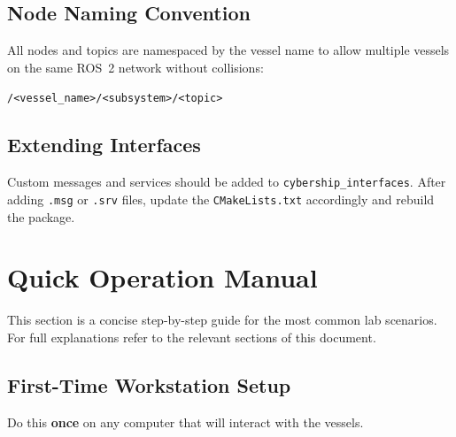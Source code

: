 \documentclass[12pt,a4paper]{article}
\begin{document}
	\subsection{Node Naming Convention}
	
	All nodes and topics are namespaced by the vessel name to allow multiple vessels on the same
	ROS~2 network without collisions:
	
	\begin{center}
		\texttt{/<vessel\_name>/<subsystem>/<topic>}
	\end{center}
	
	\subsection{Extending Interfaces}
	
	Custom messages and services should be added to \texttt{cybership\_interfaces}. After adding
	\texttt{.msg} or \texttt{.srv} files, update the \texttt{CMakeLists.txt} accordingly and
	rebuild the package.
	
	\section{Quick Operation Manual}
	\label{sec:quickops}
	
	This section is a concise step-by-step guide for the most common lab scenarios. For full
	explanations refer to the relevant sections of this document.
	
	\subsection{First-Time Workstation Setup}
	\label{ssec:first-time}
	
	Do this \textbf{once} on any computer that will interact with the vessels.
	
\end{document}
